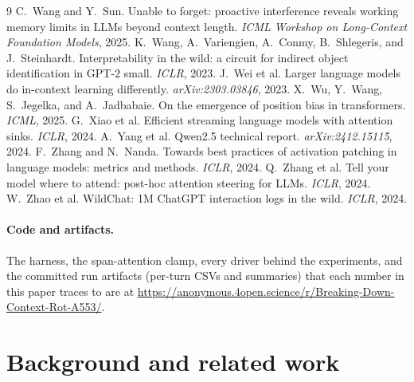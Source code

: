 \documentclass{article}
\newcommand{\repourl}{https://anonymous.4open.science/r/Breaking-Down-Context-Rot-A553/}
\newcommand{\repourl}{https://github.com/Ronen09/Breaking-Down-Context-Rot}
\begin{document}
\begin{thebibliography}{9}
 C.~Wang and Y.~Sun. Unable to forget: proactive interference reveals working memory limits in LLMs beyond context length. \emph{ICML Workshop on Long-Context Foundation Models}, 2025.
 K.~Wang, A.~Variengien, A.~Conmy, B.~Shlegeris, and J.~Steinhardt. Interpretability in the wild: a circuit for indirect object identification in GPT-2 small. \emph{ICLR}, 2023.
 J.~Wei et al. Larger language models do in-context learning differently. \emph{arXiv:2303.03846}, 2023.
 X.~Wu, Y.~Wang, S.~Jegelka, and A.~Jadbabaie. On the emergence of position bias in transformers. \emph{ICML}, 2025.
 G.~Xiao et al. Efficient streaming language models with attention sinks. \emph{ICLR}, 2024.
 A.~Yang et al. Qwen2.5 technical report. \emph{arXiv:2412.15115}, 2024.
 F.~Zhang and N.~Nanda. Towards best practices of activation patching in language models: metrics and methods. \emph{ICLR}, 2024.
 Q.~Zhang et al. Tell your model where to attend: post-hoc attention steering for LLMs. \emph{ICLR}, 2024.
 W.~Zhao et al. WildChat: 1M ChatGPT interaction logs in the wild. \emph{ICLR}, 2024.
\end{thebibliography}

\appendix
\normalsize
\raggedbottom

\paragraph{Code and artifacts.}
The harness, the span-attention clamp, every driver behind the experiments, and the committed
run artifacts (per-turn CSVs and summaries) that each number in this paper traces to are at
\url{\repourl}.

\section{Background and related work}
\label{app:related}
\end{document}

